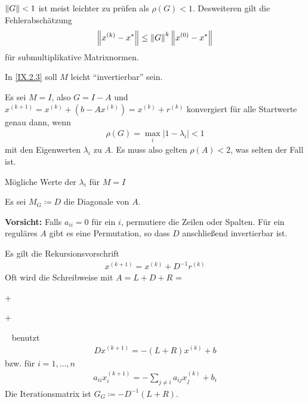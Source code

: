 $\nn[G]<1$ ist meist leichter zu prüfen als $\rho(G)<1$.
Desweiteren gilt die Fehlerabschätzung
\begin{gather}
  \nn[x^{(k)}-x^{*}]\leq \nn[G]^k\nn[x^{(0)}-x^{*}]
  \label{IX.2.10}
\end{gather}
für submultiplikative Matrixnormen.



In \eqref{IX.2.3} soll $M$ leicht \enquote{invertierbar} sein.

Es sei $M=I$, also $G=I-A$ und
$x^{(k+1)}=x^{(k)}+(b-Ax^{(k)})=x^{(k)}+r^{(k)}$
konvergiert für alle Startwerte genau dann, wenn
\begin{gather}
  \rho(G) = \max_i\left| 1-\lambda_i \right|<1
  \label{IX.3.1}
\end{gather}
mit den Eigenwerten $\lambda_i$ zu $A$.
Es muss also gelten $\rho(A) <2$, was selten der Fall ist.

\begin{image}{Mögliche Werte der $\lambda_i$ für $M=I$}
\end{image}\label{im9.3.1}

Es sei $M_G\coloneqq D$ die Diagonale von $A$.

\textbf{Vorsicht:} Falls $a_{ii}=0$ für ein $i$, 
permutiere die Zeilen oder Spalten.
Für ein reguläres $A$ gibt es eine Permutation,
so dass  $D$ anschließend invertierbar ist.

Es gilt die Rekursionsvorschrift
\begin{gather}
  x^{(k+1)}=x^{(k)}+D^{-1}r^{(k)}
  \label{IX.3.2}
\end{gather}
Oft wird die Schreibweise mit $A=L+D+R$ =
+
+
~
benutzt
\begin{gather}
  Dx^{(k+1)}= -(L+R)x^{(k)}+b
  \label{IX.3.3}
\end{gather}
bzw. für $i=1,\dotsc,n$
\begin{gather}
  a_{ii}x_i^{(k+1)} = -\sum_{j\neq i}a_{ij}x_j^{(k)}+b_i
  \label{IX.3.4}
\end{gather}
Die Iterationsmatrix ist $G_G\coloneqq -D^{-1}(L+R)$.


